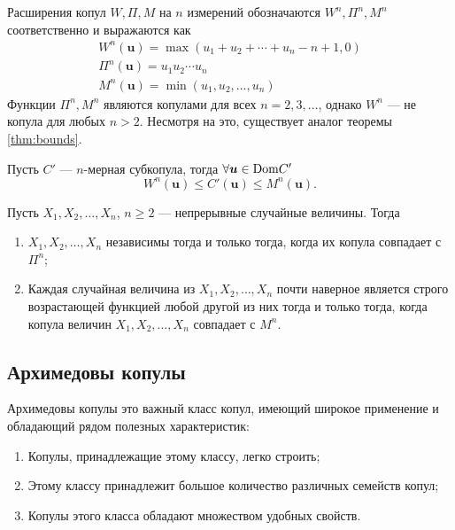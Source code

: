 Расширения копул $W, \Pi, M$ на $n$ измерений обозначаются $W^n, \Pi^n, M^n$ соответственно и выражаются как
\begin{gather}
	W^n(\bm{u}) = \max (u_1 + u_2 + \cdots + u_n - n + 1, 0) \\
	\Pi^n(\bm{u}) = u_1 u_2 \cdots u_n \\
	M^n(\bm{u}) = \min (u_1, u_2, \ldots, u_n)
\end{gather}
Функции $\Pi^n, M^n$ являются копулами для всех $n = 2, 3, \ldots$, однако $W^n$ --- не копула для любых $n > 2$. Несмотря на это, существует аналог теоремы \ref{thm:bounds}.

\begin{theorem}\label{thm:nbounds}
	Пусть $C'$ --- $n$-мерная субкопула, тогда $\forall \bm{u} \in \mathrm{Dom}{C'}$
	\begin{equation}\label{eq:nbounds}
		W^n(\bm{u}) \leqslant C'(\bm{u}) \leqslant M^n(\bm{u}).
	\end{equation}
\end{theorem}

\begin{theorem}
	Пусть $X_1, X_2, \ldots, X_n$, $n \geqslant 2$ --- непрерывные случайные величины. Тогда
	\begin{enumerate}
	\item $X_1, X_2, \ldots, X_n$ независимы тогда и только тогда, когда их копула совпадает с $\Pi^n$;
	\item Каждая случайная величина из $X_1, X_2, \ldots, X_n$ почти наверное является строго возрастающей функцией любой другой из них тогда и только тогда, когда копула величин $X_1, X_2, \ldots, X_n$ совпадает с $M^n$.
	\end{enumerate}
\end{theorem}

\subsection*{Архимедовы копулы}

Архимедовы копулы это важный класс копул, имеющий широкое применение и обладающий рядом полезных характеристик:
\begin{enumerate}
	\item Копулы, принадлежащие этому классу, легко строить;
	\item Этому классу принадлежит большое количество различных семейств копул;
	\item Копулы этого класса обладают множеством удобных свойств.
\end{enumerate}

